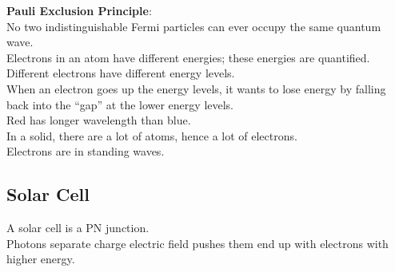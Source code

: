 \documentclass[12pt]{article}
\theoremstyle{definition}
\begin{document}
\textbf{Pauli Exclusion Principle}: \\
No two indistinguishable Fermi particles can ever occupy the same quantum wave. \\

Electrons in an atom have different energies;
these energies are quantified. \\
Different electrons have different energy levels. \\
When an electron goes up the energy levels, it wants to lose energy by falling back into the ``gap'' at the lower energy levels. \\

Red has longer wavelength than blue. \\

In a solid, there are a lot of atoms, hence a lot of electrons. \\
Electrons are in standing waves.

\subsection{Solar Cell}
A solar cell is a PN junction. \\
Photons separate charge electric field pushes them end up with electrons with higher energy.

\clearpage
\printindex
\end{document}
